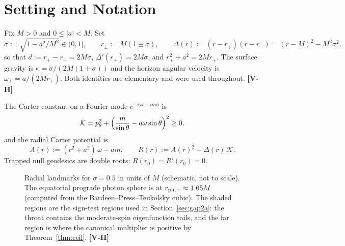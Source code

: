 \documentclass[11pt, a4paper]{article}
\newcommand{\VH}{\textcolor{vh}{\textbf{[V-H]}}}
\theoremstyle{remark}
\theoremstyle{definition}
\begin{document}
\section{Setting and Notation}
\label{sec:setting}

Fix $M>0$ and $0 \le |a| < M$. Set
\[
\sigma := \sqrt{1 - a^2/M^2} \in (0,1], \qquad r_\pm := M(1 \pm \sigma), \qquad \Delta(r) := (r - r_+)(r - r_-) = (r-M)^2 - M^2\sigma^2,
\]
so that $d := r_+ - r_- = 2M\sigma$, $\Delta'(r_+) = 2M\sigma$, and $r_+^2 + a^2 = 2Mr_+$. The surface gravity is $\kappa = \sigma/(2M(1+\sigma))$ and the horizon angular velocity is $\omega_+ = a/(2Mr_+)$. Both identities are elementary and were used throughout. \VH

The Carter constant on a Fourier mode $e^{-i\omega t + im\phi}$ is
\[
\mathcal{K} = p_\theta^2 + \Bigl(\frac{m}{\sin\theta} - a\omega\sin\theta\Bigr)^2 \ge 0,
\]
and the radial Carter potential is
\[
A(r) := (r^2+a^2)\,\omega - a m, \qquad R(r) := A(r)^2 - \Delta(r)\,\mathcal{K}.
\]
Trapped null geodesics are double roots: $R(r_0) = R'(r_0) = 0$.

\begin{figure}[H]
\centering
{}
\caption{Radial landmarks for $\sigma = 0.5$ in units of $M$ (schematic, not to scale). The equatorial prograde photon sphere is at $r_{{\rm ph},+}\approx 1.65M$ (computed from the Bardeen--Press--Teukolsky cubic). The shaded regions are the sign-test regions used in Section~\ref{sec:gap2a}: the throat contains the moderate-spin eigenfunction tails, and the far region is where the canonical multiplier is positive by Theorem~\ref{thm:ceil}. \VH}
\label{fig:landmarks}
\end{figure}
\end{document}
